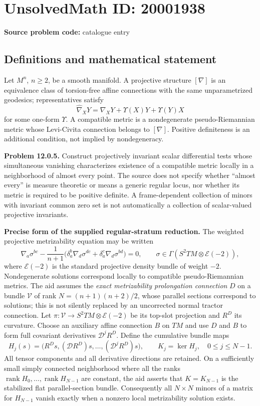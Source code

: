 \documentclass[11pt]{article}
\begin{document}
\section*{UnsolvedMath ID: 20001938}
\textbf{Source problem code:} catalogue entry
\subsection{Definitions and mathematical statement}
Let $M^n$, $n\ge2$, be a smooth manifold. A projective structure $[\nabla]$ is an equivalence class of torsion-free affine connections with the same unparametrized geodesics; representatives satisfy
\[
 \widehat\nabla_XY=\nabla_XY+\Upsilon(X)Y+\Upsilon(Y)X
\]
for some one-form $\Upsilon$. A compatible metric is a nondegenerate pseudo-Riemannian metric whose Levi-Civita connection belongs to $[\nabla]$. Positive definiteness is an additional condition, not implied by nondegeneracy.

\textbf{Problem 12.0.5.} Construct projectively invariant scalar differential tests whose simultaneous vanishing characterizes existence of a compatible metric locally in a neighborhood of almost every point. The source does not specify whether ``almost every'' is measure theoretic or means a generic regular locus, nor whether its metric is required to be positive definite. A frame-dependent collection of minors with invariant common zero set is not automatically a collection of scalar-valued projective invariants.

\textbf{Precise form of the supplied regular-stratum reduction.} The weighted projective metrizability equation may be written
\[
 \nabla_a\sigma^{bc}-\frac1{n+1}
 \bigl(\delta_a^b\nabla_d\sigma^{dc}
       +\delta_a^c\nabla_d\sigma^{bd}\bigr)=0,
 \qquad \sigma\in\Gamma(S^2TM\otimes\mathcal E(-2)),
\]
where $\mathcal E(-2)$ is the standard projective density bundle of weight $-2$. Nondegenerate solutions correspond locally to compatible pseudo-Riemannian metrics. The aid assumes the \emph{exact metrizability prolongation connection} $D$ on a bundle $\mathcal V$ of rank $N=(n+1)(n+2)/2$, whose parallel sections correspond to solutions; this is not silently replaced by an uncorrected normal tractor connection. Let $\pi:\mathcal V\to S^2TM\otimes\mathcal E(-2)$ be its top-slot projection and $R^D$ its curvature. Choose an auxiliary affine connection $B$ on $TM$ and use $D$ and $B$ to form full covariant derivatives $\mathcal D^jR^D$. Define the cumulative bundle maps
\[
 H_j(s)=\bigl(R^D s,(\mathcal D R^D)s,\ldots,
                         (\mathcal D^jR^D)s\bigr),
 \qquad K_j=\ker H_j,\quad 0\le j\le N-1.
\]
All tensor components and all derivative directions are retained. On a sufficiently small simply connected neighborhood where all the ranks $\operatorname{rank}H_0,\ldots,\operatorname{rank}H_{N-1}$ are constant, the aid asserts that $K=K_{N-1}$ is the stabilized flat parallel-section bundle. Consequently all $N\times N$ minors of a matrix for $H_{N-1}$ vanish exactly when a nonzero local metrizability solution exists.
\end{document}
